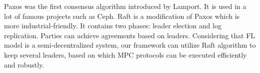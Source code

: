 Paxos was the first consensus algorithm introduced by Lamport\cite{Paxos}. It is used in a lot of famous projects such as Ceph\cite{Ceph}. Raft is a modification of Paxos which is more industrial-friendly\cite{Raft}. It contains two phases: leader election and log replication. Parties can achieve agreements based on leaders. Considering that FL model is a semi-decentralized system, our framework can utilize Raft algorithm to keep several leaders, based on which MPC protocols can be executed efficiently and robustly.
